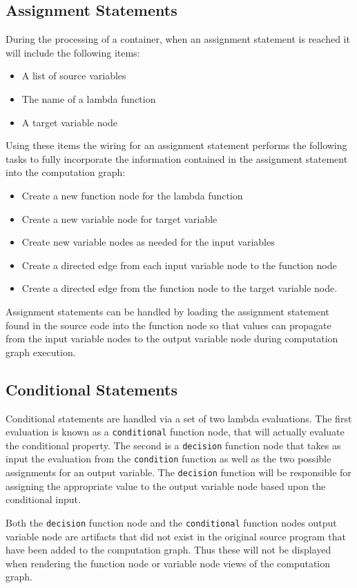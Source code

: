 \subsection{Assignment Statements\label{sec:assg_stmts}}
During the processing of a container, when an assignment statement is reached it will include the following items:
\begin{itemize}
  \item A list of source variables
  \item The name of a lambda function
  \item A target variable node
\end{itemize}
Using these items the wiring for an assignment statement performs the following tasks to fully incorporate the information contained in the assignment statement into the computation graph:
\begin{itemize}
  \item Create a new function node for the lambda function
  \item Create a new variable node for target variable
  \item Create new variable nodes as needed for the input variables
  \item Create a directed edge from each input variable node to the function node
  \item Create a directed edge from the function node to the target variable node.
\end{itemize}
Assignment statements can be handled by loading the assignment statement found in the source code into the function node so that values can propagate from the input variable nodes to the output variable node during computation graph execution.

\subsection{Conditional Statements\label{sec:cond_stmts}}
Conditional statements are handled via a set of two lambda evaluations. The first evaluation is known as a \texttt{conditional} function node, that will actually evaluate the conditional property. The second is a \texttt{decision} function node that takes as input the evaluation from the \texttt{condition} function as well as the two possible assignments for an output variable. The \texttt{decision} function will be responsible for assigning the appropriate value to the output variable node based upon the conditional input.

Both the \texttt{decision} function node and the \texttt{conditional} function nodes output variable node are artifacts that did not exist in the original source program that have been added to the computation graph. Thus these will not be displayed when rendering the function node or variable node views of the computation graph.

